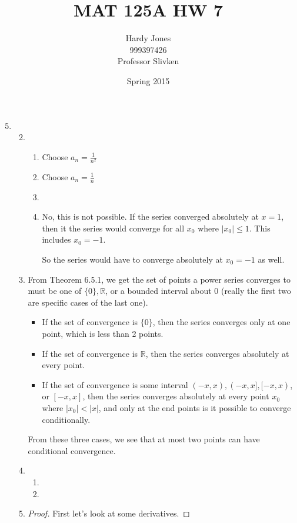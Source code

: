 \documentclass[12pt,letterpaper]{article}
\title{MAT 125A HW 7\vspace{-2ex}}
\author{Hardy Jones\\
        999397426\\
        Professor Slivken\vspace{-2ex}}
\date{Spring 2015}
\begin{document}
  \maketitle

  \begin{enumerate}
    \setcounter{enumi}{4}
    \item
      \begin{enumerate}
        \setcounter{enumii}{1}
        \item
          \begin{enumerate}
            \item
              Choose $a_n = \frac{1}{n^2}$
            \item
              Choose $a_n = \frac{1}{n}$
            \item
            \item
              No, this is not possible.
              If the series converged absolutely at $x = 1$,
              then it the series would converge for all $x_0$ where $|x_0| \leq 1$.
              This includes $x_0 = -1$.

              So the series would have to converge absolutely at $x_0 = -1$ as well.
          \end{enumerate}
        \item
          From Theorem 6.5.1, we get the set of points a power series converges to must be one of $\{0\}, \mathbb{R}$, or a bounded interval about 0 (really the first two are specific cases of the last one).
          \begin{itemize}
            \item
              If the set of convergence is $\{0\}$, then the series converges only at one point, which is less than 2 points.
            \item
              If the set of convergence is $\mathbb{R}$, then the series converges absolutely at every point.
            \item
              If the set of convergence is some interval $(-x, x), (-x, x], [-x, x)$, or $[-x, x]$, then the series converges absolutely at every point $x_0$ where $|x_0| < |x|$, and only at the end points is it possible to converge conditionally.
          \end{itemize}

          From these three cases, we see that at most two points can have conditional convergence.
        \item
          \begin{enumerate}
            \item
            \item
          \end{enumerate}
        \setcounter{enumii}{8}
        \item
          \begin{proof}
            First let's look at some derivatives.


\end{proof}
\end{enumerate}
\end{enumerate}
\end{document}
